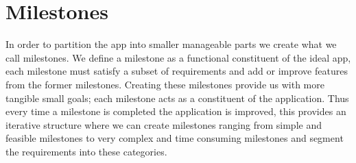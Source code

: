 \section{Milestones}\label{sec:milestones}
In order to partition the app into smaller manageable parts we create what we call milestones.
We define a milestone as a functional constituent of the ideal app, each milestone must satisfy a subset of requirements and add or improve features from the former milestones.
Creating these milestones provide us with more tangible small goals; each milestone acts as a constituent of the application.
Thus every time a milestone is completed the application is improved, this provides an iterative structure where we can create milestones ranging from simple and feasible milestones to very complex and time consuming milestones and segment the requirements into these categories.

